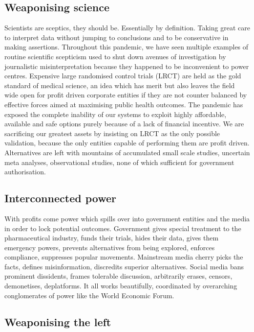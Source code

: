 \documentclass[11pt,a4paper]{article}
\begin{document}
\subsection*{Weaponising science}

Scientists are sceptics, they should be. Essentially by definition. Taking great care to interpret data without jumping to conclusions and to be conservative in making assertions. Throughout this pandemic, we have seen multiple examples of routine scientific scepticism used to shut down avenues of investigation by journalistic misinterpretation because they happened to be inconvenient to power centres. Expensive large randomised control trials (LRCT) are held as the gold standard of medical science, an idea which has merit but also leaves the field wide open for profit driven corporate entities if they are not counter balanced by effective forces aimed at maximising public health outcomes. The pandemic has exposed the complete inability of our systems to exploit highly affordable, available and safe options purely because of a lack of financial incentive. We are sacrificing our greatest assets by insisting on LRCT as the only possible validation, because the only entities capable of performing them are profit driven. Alternatives are left with mountains of accumulated small scale studies, uncertain meta analyses, observational studies, none of which sufficient for government authorisation.

\subsection*{Interconnected power}

With profits come power which spills over into government entities and the media in order to lock potential outcomes. Government gives special treatment to the pharmaceutical industry, funds their trials, hides their data, gives them emergency powers, prevents alternatives from being explored, enforces compliance, suppresses popular movements. Mainstream media cherry picks the facts, defines misinformation, discredits superior alternatives. Social media bans prominent dissidents, frames tolerable discussion, arbitrarily erases, censors, demonetises, deplatforms. It all works beautifully, coordinated by overarching conglomerates of power like the World Economic Forum.

\subsection*{Weaponising the left}
\end{document}
